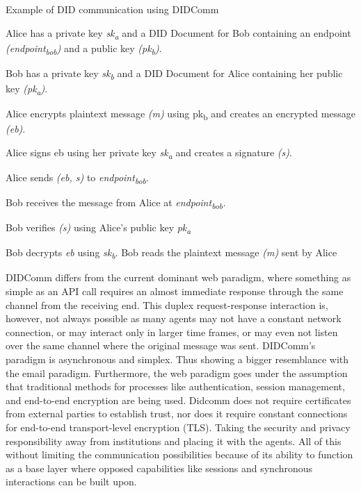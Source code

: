 \begin{algorithm}[H]
\caption{Example of DID communication using DIDComm \cite{Abramson_2020}}
\label{alg:didcomm_example}
  \begin{algorithmic}[1]
    \State Alice has a private key \emph{sk\textsubscript{a}} and a DID Document for Bob containing an endpoint \emph{(endpoint\textsubscript{bob})} and a public key \emph{(pk\textsubscript{b})}.

    \State Bob has a private key \emph{sk\textsubscript{b}} and a DID Document for Alice containing her public key \emph{(pk\textsubscript{a})}.

    \State Alice encrypts plaintext message \emph{(m)} using pk\textsubscript{b} and creates an encrypted message \emph{(eb)}.

    \State Alice signs eb using her private key \emph{sk\textsubscript{a}} and creates a signature \emph{(s)}.

    \State Alice sends \emph{(eb, s)} to \emph{endpoint\textsubscript{bob}}.

    \State Bob receives the message from Alice at \emph{{endpoint\textsubscript{bob}}.}

    \State Bob verifies \emph{(s)} using Alice's public key \emph{pk\textsubscript{a}}

    \State Bob decrypts \emph{eb} using \emph{sk\textsubscript{b}}.
    \State Bob reads the plaintext message \emph{(m)} sent by Alice
    \EndIf
  \end{algorithmic}
\end{algorithm}



DIDComm differs from the current dominant web paradigm, where something as simple as an API call requires an almost immediate response through the same channel from the receiving end. This duplex request-response interaction is, however, not always possible as many agents may not have a constant network connection, or may interact only in larger time frames, or may even not listen over the same channel where the original message was sent. DIDComm's paradigm is asynchronous and simplex. Thus showing a bigger resemblance with the email paradigm. Furthermore, the web paradigm goes under the assumption that traditional methods for processes like authentication, session management, and end-to-end encryption are being used. Didcomm does not require certificates from external parties to establish trust, nor does it require constant connections for end-to-end transport-level encryption (TLS). Taking the security and privacy responsibility away from institutions and placing it with the agents. All of this without limiting the communication possibilities because of its ability to function as a base layer where opposed capabilities like sessions and synchronous interactions can be built upon. \cite{curren_looker_terbu_2020}

